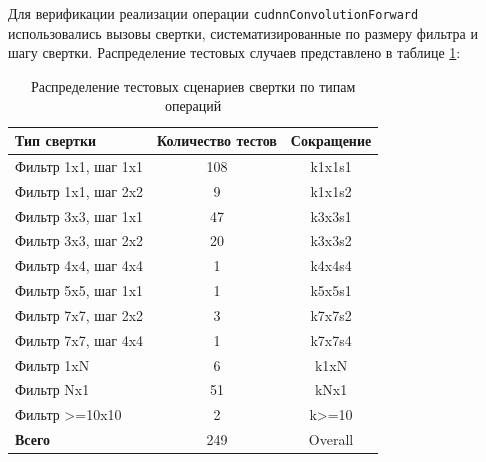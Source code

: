 Для верификации реализации операции \texttt{cudnnConvolutionForward} использовались вызовы свертки,
систематизированные по размеру фильтра и шагу свертки. Распределение тестовых случаев представлено
в таблице \ref{tbl:conv_test_distribution}:

\begin{table}[h]
\centering
\small
\begin{tabular}{|l|c|c|}
\hline
\textbf{Тип свертки} & \textbf{Количество тестов} & \textbf{Сокращение} \\ \hline
Фильтр 1x1, шаг 1x1 & 108 & k1x1s1 \\ \hline
Фильтр 1x1, шаг 2x2 & 9 & k1x1s2 \\ \hline
Фильтр 3x3, шаг 1x1 & 47 & k3x3s1 \\ \hline
Фильтр 3x3, шаг 2x2 & 20 & k3x3s2 \\ \hline
Фильтр 4x4, шаг 4x4 & 1 & k4x4s4 \\ \hline
Фильтр 5x5, шаг 1x1 & 1 & k5x5s1 \\ \hline
Фильтр 7x7, шаг 2x2 & 3 & k7x7s2 \\ \hline
Фильтр 7x7, шаг 4x4 & 1 & k7x7s4 \\ \hline
Фильтр 1xN & 6 & k1xN \\ \hline
Фильтр Nx1 & 51 & kNx1 \\ \hline
Фильтр >=10x10 & 2 & k>=10 \\ \hline
\hline
\multicolumn{1}{|l|}{\textbf{Всего}} & 249 & Overall \\ \hline
\end{tabular}
\caption{Распределение тестовых сценариев свертки по типам операций}
\label{tbl:conv_test_distribution}
\end{table}

